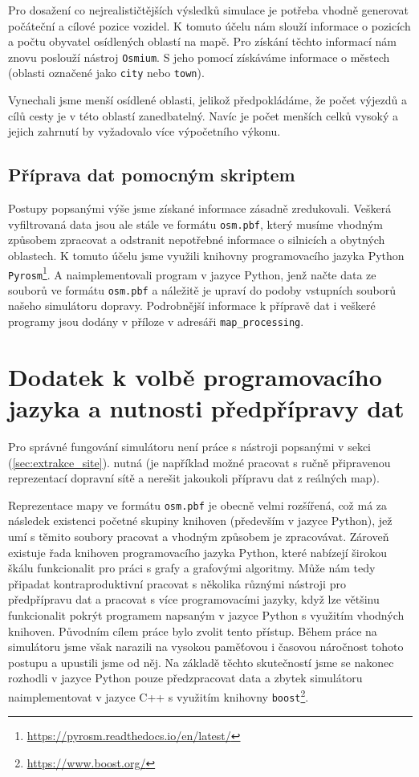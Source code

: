 Pro dosažení co nejrealističtějších výsledků simulace je potřeba vhodně
generovat počáteční a cílové pozice vozidel. K tomuto účelu nám slouží informace
o pozicích a počtu obyvatel osídlených oblastí na mapě. 
Pro získání těchto informací nám znovu poslouží nástroj \texttt{Osmium}. 
S jeho pomocí získáváme informace o městech (oblasti označené jako \texttt{city}
nebo \texttt{town}). 

Vynechali jsme menší osídlené oblasti, jelikož předpokládáme, že
počet výjezdů a cílů cesty je v této oblastí zanedbatelný. Navíc je počet
menších celků vysoký a jejich zahrnutí by vyžadovalo více výpočetního výkonu.


\subsection{Příprava dat pomocným skriptem}

Postupy popsanými výše jsme získané informace zásadně zredukovali. Veškerá 
vyfiltrovaná data jsou ale stále ve formátu \texttt{osm.pbf}, který musíme 
vhodným způsobem zpracovat a odstranit nepotřebné informace o silnicích
a obytných oblastech. K tomuto účelu jsme využili knihovny programovacího
jazyka Python \texttt{Pyrosm}\footnote{\url{https://pyrosm.readthedocs.io/en/latest/}}.
A naimplementovali program v jazyce Python, jenž načte data ze souborů ve formátu
\texttt{osm.pbf} a náležitě je upraví do podoby vstupních souborů našeho 
simulátoru dopravy. Podrobnější informace k přípravě dat i veškeré programy 
jsou dodány v příloze v adresáři \texttt{map\_processing}. 


\section{Dodatek k volbě programovacího jazyka a nutnosti předpřípravy dat}

Pro správné fungování simulátoru není práce s nástroji popsanými v sekci (\cref{sec:extrakce_site}).
nutná (je například možné pracovat s ručně připravenou reprezentací
dopravní sítě a nerešit jakoukoli přípravu dat z reálných map).

Reprezentace mapy ve formátu \texttt{osm.pbf} je obecně velmi rozšířená, což má za 
následek existenci početné skupiny knihoven (především v jazyce Python), jež umí
s těmito soubory pracovat a vhodným způsobem je zpracovávat. Zároveň existuje 
řada knihoven programovacího jazyka Python, které nabízejí širokou
škálu funkcionalit pro práci s grafy a grafovými algoritmy. 
Může nám tedy připadat kontraproduktivní pracovat s několika různými 
nástroji pro předpřípravu dat a pracovat s více programovacími jazyky, 
když lze většinu funkcionalit pokrýt programem napsaným v jazyce Python s 
využitím vhodných knihoven. 
Původním cílem práce bylo zvolit tento přístup. Během práce na simulátoru 
jsme však narazili na vysokou paměťovou i časovou náročnost tohoto postupu
a upustili jsme od něj.  
Na základě těchto skutečností jsme se nakonec rozhodli v jazyce Python 
pouze předzpracovat data a zbytek simulátoru naimplementovat v 
jazyce C++ s využitím knihovny \texttt{boost}\footnote{\url{https://www.boost.org/}}.
